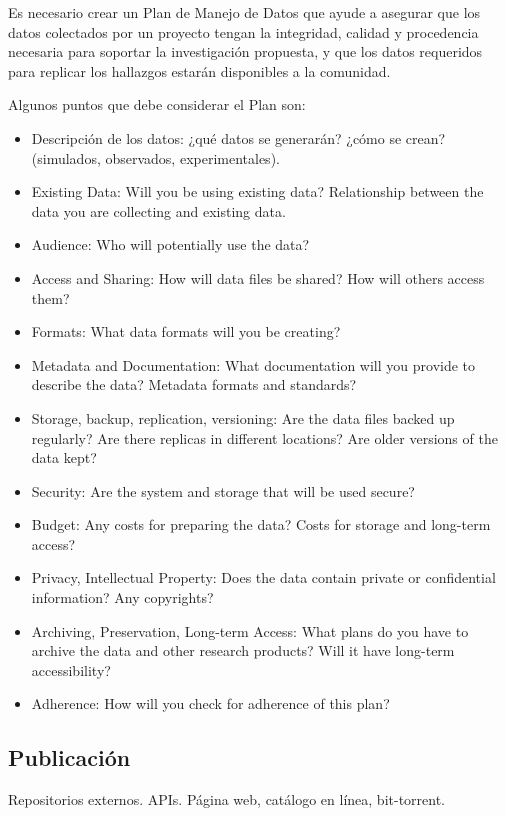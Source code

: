 \documentclass[
10pt, %
letterpaper, %
oneside, %
headinclude,footinclude, %
BCOR5mm, %
]{scrartcl}
\begin{document}
Es necesario crear un Plan de Manejo de Datos que ayude a asegurar que
los datos colectados por un proyecto tengan la integridad, calidad y
procedencia necesaria para soportar la investigación propuesta, y que
los datos requeridos para replicar los hallazgos estarán disponibles a
la comunidad.

Algunos puntos que debe considerar el Plan son:

\begin{itemize}
\item
  Descripción de los datos: ¿qué datos se generarán? ¿cómo se crean?
  (simulados, observados, experimentales).
\item    Existing Data: Will you be using existing data? Relationship between the data you are collecting and existing data.
\item    Audience: Who will potentially use the data?
\item    Access and Sharing: How will data ﬁles be shared? How will others access them?
\item    Formats: What data formats will you be creating?
\item    Metadata and Documentation: What documentation will you provide to describe the data? Metadata formats and standards?
\item    Storage, backup, replication, versioning: Are the data ﬁles backed up regularly? Are there replicas in different locations? Are older versions of the data kept?
\item    Security: Are the system and storage that will be used secure?
\item    Budget: Any costs for preparing the data? Costs for storage and long-term access?
\item    Privacy, Intellectual Property: Does the data contain private or conﬁdential information? Any copyrights?
\item    Archiving, Preservation, Long-term Access: What plans do you have to archive the data and other research products? Will it have long-term accessibility?
\item    Adherence: How will you check for adherence of this plan?
\end{itemize}

\subsection{Publicación}
Repositorios externos.
APIs.
Página web, catálogo en línea, bit-torrent.
\end{document}
